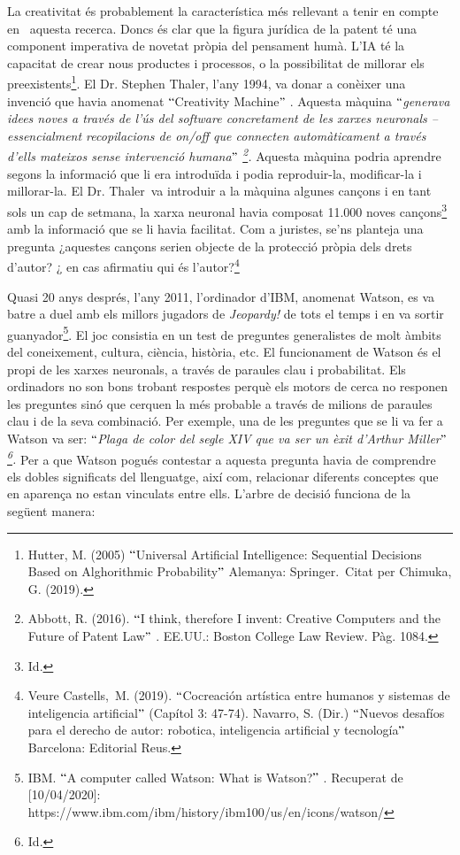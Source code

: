 \documentclass[12pt]{article}
\begin{document}
\vspace{\baselineskip}
La creativitat és probablement la característica més rellevant a tenir en compte en \  aquesta recerca. Doncs és clar que la figura jurídica de la patent té una component imperativa de novetat pròpia del pensament humà. L’IA té la capacitat de crear nous productes i processos, o la possibilitat de millorar els preexistents\footnote{ Hutter, M. (2005) $``$Universal Artificial Intelligence: Sequential Decisions Based on Alghorithmic Probability$"$  Alemanya: Springer.\ Citat per  Chimuka, G. (2019). }. El Dr. Stephen Thaler, l’any 1994, va donar a conèixer una invenció que havia anomenat $``$Creativity Machine$"$ . Aquesta màquina $``$\textit{generava idees noves a través de l’ús del software concretament de les xarxes neuronals – essencialment recopilacions de on/off que connecten automàticament a través d’ells mateixos sense intervenció humana$"$ \footnote{ Abbott, R. (2016). $``$I think, therefore I invent: Creative Computers and the Future of Patent Law$"$ . EE.UU.: Boston College Law Review. Pàg. 1084.  }. }Aquesta màquina podria aprendre segons la informació que li era introduïda i podia reproduir-la, modificar-la i millorar-la. El Dr. Thaler\ va introduir a la màquina algunes cançons i en  tant sols un cap de setmana, la xarxa neuronal havia composat 11.000 noves cançons\footnote{ Id. } amb la informació que se li havia facilitat. Com a juristes, se’ns planteja una pregunta ¿aquestes cançons serien objecte de la protecció pròpia dels drets d’autor? ¿ en cas afirmatiu qui és l’autor?\footnote{ Veure Castells,\ M. (2019).  $``$Cocreación artística entre humanos y sistemas de inteligencia artificial$"$  (Capítol 3: 47-74). Navarro, S. (Dir.) $``$Nuevos desafíos para el derecho de autor: robotica, inteligencia artificial y tecnología$"$  Barcelona: Editorial Reus.  }{\fontsize{10pt}{12.0pt}\selectfont  \par}\par


\vspace{\baselineskip}
Quasi 20 anys després, l’any 2011, l’ordinador d’IBM, anomenat Watson, es va batre a duel amb els millors jugadors de \textit{Jeopardy!} de tots el temps i en va sortir guanyador\footnote{ IBM. $``$A computer called Watson: What is Watson?$"$ . Recuperat de [10/04/2020]: https://www.ibm.com/ibm/history/ibm100/us/en/icons/watson/  }. El joc consistia en un test de preguntes generalistes de molt àmbits del coneixement, cultura, ciència, història, etc. El funcionament de Watson és el propi de les xarxes neuronals, a través de paraules clau i probabilitat. Els ordinadors no son bons trobant respostes perquè els motors de cerca no responen les preguntes sinó que cerquen la més probable a través de milions de paraules clau i de la seva combinació.  Per exemple, una de les preguntes que se li va fer a Watson va ser: \textit{$``$Plaga de color del segle XIV que va ser un èxit d’Arthur Miller$"$ \footnote{ Id. }. }Per a que Watson pogués contestar a aquesta pregunta havia de comprendre els dobles significats del llenguatge, així com, relacionar diferents conceptes que en aparença no estan vinculats entre ells. L’arbre de decisió funciona de la següent manera: \par
\end{document}
